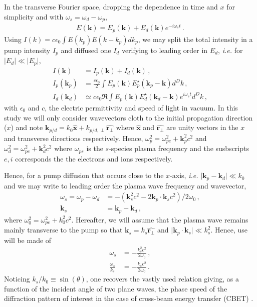 \documentclass[
 reprint,
 amsmath,amssymb,
 aps,
]{revtex4-1}
\begin{document}
In the transverse Fourier space, dropping the dependence in time and $x$ for simplicity and with $\omega_s=\omega_d - \omega_p$,
\begin{align}
E(\mathbf{k}) =     E_p(\mathbf{k})
+  E_d(\mathbf{k}) e^{ -i \omega_s t}   \, .
\end{align} 
Using $I(k)=c\epsilon_0 \int E(k_p) E(k-k_p) dk_p$, we may split the total intensity in a pump intensity $I_p$ and diffused one $I_d$ verifying to leading order in $E_d$, \emph{i.e.} for $\vert E_d\vert \ll \vert E_p \vert$, 
\begin{align}
I(\mathbf{k}) &=I_p(\mathbf{k})+I_d(\mathbf{k})\, , \label{eq:itot}\\
I_p(\mathbf{k}_p) &=   \frac{c\epsilon_0}{2} \int E_p(\mathbf{k}) E_p^\star(\mathbf{k}_p-\mathbf{k}) d^Dk \, , \label{eq:ip} \\
I_d(\mathbf{k}_d) &\simeq   c\epsilon_0  \Re \int E_p(\mathbf{k}) E_d^\star(\mathbf{k}_d-\mathbf{k})e^{i\omega_s t } d^Dk \, , \label{eq:id}
\end{align}
with $\epsilon_0$ and  $c$, the electric permittivity and speed of light in vacuum.
In this study we will only consider wavevectors cloth to the initial
propagation direction ($x$) and note $\mathbf{k}_{p/d}=k_0\hat{\mathbf{x}} +k_{p/d,\perp}\hat{\mathbf{r}_\perp}  $ where $\hat{\mathbf{x}}$ and $\hat{\mathbf{r}_\perp}$ are unity vectors in the $x$ and transverse directions respectively. Hence, $\omega_p^2 = \omega_{pe}^2+ \mathbf{k}_p^2c^2$ and $\omega_d^2 = \omega_{pe}^2+\mathbf{k}_d^2c^2$ where $\omega_{ps}$ is the $s$-species plasma frequency and the susbscripts $e,i$ corresponds the the electrons and ions respectively.

Hence, for a pump  diffusion that occurs close to the $x$-axis,  \emph{i.e.}  $\vert \mathbf{k}_p -\mathbf{k}_d\vert \ll k_0$ and we may write to leading order the plasma wave frequency and wavevector,
\begin{align}
\omega_s=\omega_p-\omega_d&= -(\mathbf{k}_s^2 c^2-2\mathbf{k}_p\cdot\mathbf{k}_s c^2)/2\omega_0
\, , \nonumber\\
\mathbf{k}_s& = \mathbf{k}_p-\mathbf{k}_d\, ,
\end{align}
where $\omega_0^2= \omega_{pe}^2+ k_0^2c^2$.
Hereafter, we will assume that the plasma wave remains mainly transverse to the pump so that $\mathbf{k}_s=k_s \hat{\mathbf{r}_\perp}$ and $ \vert \mathbf{k}_p\cdot\mathbf{k}_s\vert \ll k_s^2$. 
Hence, use will be made of 
\begin{align}
\omega_s  &= -\frac{k_s^2 c^2 }{2\omega_0} \, ,\label{eq:ws}\\
\frac{\omega_s}{k_s}& = -\frac{k_s c^2 }{2\omega_0} \label{eq:vphis} \, .
\end{align}
Noticing $k_s/k_0\equiv \sin(\theta) $, one recovers the vastly used  relation giving, as a function of the incident angle of two plane waves, the phase speed of the  diffraction pattern of interest in the case of cross-beam energy transfer (CBET) \cite[]{POP_Debayle_2018}.
\end{document}
